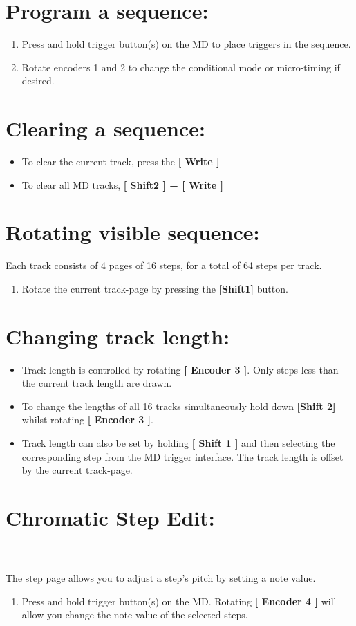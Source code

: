 \section{Program a sequence:}
\begin{enumerate}
\item Press and hold trigger button(s) on the MD to place triggers in the sequence.
\item Rotate encoders 1 and 2 to change the conditional mode or micro-timing if desired.
\end{enumerate}
\section{Clearing a sequence:}
\begin{itemize}
\item To clear the current track, press the\textbf{ [ Write ]}
\item To clear all MD tracks,  \textbf{[ Shift2 ] + [ Write ]}
\end{itemize}
\section{Rotating visible sequence:}
Each track consists of 4 pages of 16 steps, for a total of 64 steps per track.
\begin{enumerate}
\item Rotate the current track-page by pressing the \textbf{[Shift1] }button.
\end{enumerate}
\section{Changing track length:}
\begin{itemize}
\item Track length is controlled by rotating \textbf{[ Encoder 3 ]}. Only steps less than the current track length are drawn.
\item To change the lengths of all 16 tracks simultaneously hold down \textbf{[Shift 2]} whilst rotating \textbf{[ Encoder 3 ]}.
\item Track length can also be set by holding \textbf{[ Shift 1 ]} and then selecting the corresponding step from the MD trigger interface. The track length is offset by the current track-page.
\end{itemize}
\section{Chromatic Step Edit:}
\\
\\
The step page allows you to adjust a step's pitch by setting a note value. 
\begin{enumerate}
\item Press and hold trigger button(s) on the MD. Rotating \textbf{[ Encoder 4 ]} will allow you change the note value of the selected steps.
\end{enumerate}
